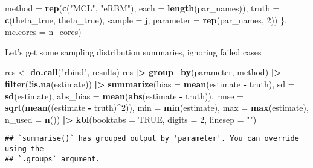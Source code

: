 \documentclass[
]{article}
\newenvironment{Shaded}{\begin{snugshade}}{\end{snugshade}}
\newcommand{\AttributeTok}[1]{\textcolor[rgb]{0.13,0.29,0.53}{#1}}
\newcommand{\ConstantTok}[1]{\textcolor[rgb]{0.56,0.35,0.01}{#1}}
\newcommand{\DecValTok}[1]{\textcolor[rgb]{0.00,0.00,0.81}{#1}}
\newcommand{\FunctionTok}[1]{\textcolor[rgb]{0.13,0.29,0.53}{\textbf{#1}}}
\newcommand{\NormalTok}[1]{#1}
\newcommand{\OtherTok}[1]{\textcolor[rgb]{0.56,0.35,0.01}{#1}}
\newcommand{\SpecialCharTok}[1]{\textcolor[rgb]{0.81,0.36,0.00}{\textbf{#1}}}
\newcommand{\StringTok}[1]{\textcolor[rgb]{0.31,0.60,0.02}{#1}}
\begin{document}
\begin{Shaded}
\begin{Highlighting}[]
                                    \AttributeTok{method =} \FunctionTok{rep}\NormalTok{(}\FunctionTok{c}\NormalTok{(}\StringTok{"MCL"}\NormalTok{, }\StringTok{"eRBM"}\NormalTok{), }\AttributeTok{each =} \FunctionTok{length}\NormalTok{(par\_names)),}
                                    \AttributeTok{truth =} \FunctionTok{c}\NormalTok{(theta\_true, theta\_true),}
                                    \AttributeTok{sample =}\NormalTok{ j,}
                                    \AttributeTok{parameter =} \FunctionTok{rep}\NormalTok{(par\_names, }\DecValTok{2}\NormalTok{))}
\NormalTok{                     \}, }\AttributeTok{mc.cores =}\NormalTok{ n\_cores)}
\end{Highlighting}
\end{Shaded}

Let's get some sampling distribution summaries, ignoring failed cases

\begin{Shaded}
\begin{Highlighting}[]
\NormalTok{res }\OtherTok{\textless{}{-}} \FunctionTok{do.call}\NormalTok{(}\StringTok{"rbind"}\NormalTok{, results)}
\NormalTok{res }\SpecialCharTok{|\textgreater{}} \FunctionTok{group\_by}\NormalTok{(parameter, method) }\SpecialCharTok{|\textgreater{}}
    \FunctionTok{filter}\NormalTok{(}\SpecialCharTok{!}\FunctionTok{is.na}\NormalTok{(estimate)) }\SpecialCharTok{|\textgreater{}}
    \FunctionTok{summarize}\NormalTok{(}\AttributeTok{bias =} \FunctionTok{mean}\NormalTok{(estimate }\SpecialCharTok{{-}}\NormalTok{ truth),}
              \AttributeTok{sd =} \FunctionTok{sd}\NormalTok{(estimate),}
              \AttributeTok{abs\_bias =} \FunctionTok{mean}\NormalTok{(}\FunctionTok{abs}\NormalTok{(estimate }\SpecialCharTok{{-}}\NormalTok{ truth)),}
              \AttributeTok{rmse =} \FunctionTok{sqrt}\NormalTok{(}\FunctionTok{mean}\NormalTok{((estimate }\SpecialCharTok{{-}}\NormalTok{ truth)}\SpecialCharTok{\^{}}\DecValTok{2}\NormalTok{)),}
              \AttributeTok{min =} \FunctionTok{min}\NormalTok{(estimate),}
              \AttributeTok{max =} \FunctionTok{max}\NormalTok{(estimate),}
              \AttributeTok{n\_used =} \FunctionTok{n}\NormalTok{()) }\SpecialCharTok{|\textgreater{}}
  \FunctionTok{kbl}\NormalTok{(}\AttributeTok{booktabs =} \ConstantTok{TRUE}\NormalTok{, }\AttributeTok{digits =} \DecValTok{2}\NormalTok{, }\AttributeTok{linesep =} \StringTok{""}\NormalTok{)}
\end{Highlighting}
\end{Shaded}

\begin{verbatim}
## `summarise()` has grouped output by 'parameter'. You can override using the
## `.groups` argument.
\end{verbatim}
\end{document}
